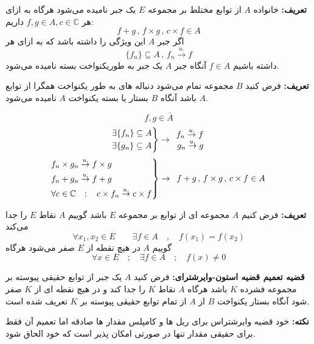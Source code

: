 \documentclass[12pt]{report}
\begin{document}
\textbf{تعریف:}
خانواده 
$A$
از توابع مختلط بر مجموعه
$E$
یک جبر نامیده می‌شود هرگاه به ازای هر
$f, g \in A , c \in \mathbb{C}$
داریم:
\[
f + g \, , \, f \times g \,,\, c \times f \in A
\]
اگر جبر 
$A$
این ویژگی را داشته باشد که به ازای هر
\[
\{f_n\} \subseteq A \, , \, f_n  \overset{u.}{\rightarrow} f
\]
داشته باشیم 
$f \in A$
 آنگاه جبر
$A$
یک جبر به طوریکنواخت بسته نامیده می‌شود.

\textbf{تعریف:}
فرض کنید
$B$
 مجموعه تمام می‌شود دنباله های به طور یکنواخت همگرا از توابع
 $A$
 باشد آنگاه
 $B$
 بستار یا بسته یکنواخت 
 $A$
 نامیده می‌شود.


\[
f, g \in \bar{A}
\]
\[
\begin{rcases}
	\exists \{f_n\} \subseteq A \\
	\exists \{g_n\} \subseteq A
\end{rcases}
 \rightarrow
\begin{array}{r@{\;}l}
	  f_n  \overset{u.}{\rightarrow} f \\
	 g_n  \overset{u.}{\rightarrow} g\\
\end{array}
\]
\[
\begin{rcases}
		f_n \times g_n  \overset{u.}{\rightarrow} f \times g \\
		f_n + g_n  \overset{u.}{\rightarrow} f + g \\
		\forall c \in \mathbb{C} \quad ; \quad c \times f_n  \overset{u.}{\rightarrow} c \times f 
\end{rcases}
\rightarrow
\begin{array}{r@{\;}l}
	f + g \, , \, f \times g \,,\, c \times f \in A
\end{array}
\]

\textbf{تعریف:}
فرض کنیم 
$A$
مجموعه ای از توابع بر مجموعه 
$E$
باشد گوییم
$A$
نقاط 
$E$
را جدا می‌کند
\[
\forall x_1 , x_2 \in E \qquad \exists f \in A \quad , \quad f(x_1) = f(x_2)
\]
گوییم 
$A$
در هیچ نقطه از 
$E$
صفر می‌شود هرگاه
\[
\forall x \in E \quad ; \quad \exists f \in A \quad ; \quad f(x) \neq 0
\]

\textbf{قضیه تعمیم قضیه استون-وایرشترای:}
فرض کنید 
$A$
یک جبر از توابع حقیقی پیوسته بر مجموعه فشرده 
$K$
 باشد هرگاه 
 $A$
نقاط 
$K$
را جدا کند و در هیچ نقطه ای از 
$K$
صفر شود آنگاه بستار یکنواخت 
$B$
از 
$A$
از تمام توابع حقیقی پیوسته بر 
$K$
تعریف شده است.



 \textbf{نکته:}
 خود قضیه وایرشتراس برای ریل ها و کامپلس مقدار ها صادقه اما تعمیم آن فقط برای حقیقی مقدار تنها در صورتی امکان پذیر است که خود الحاق شود.
 
\end{document}
